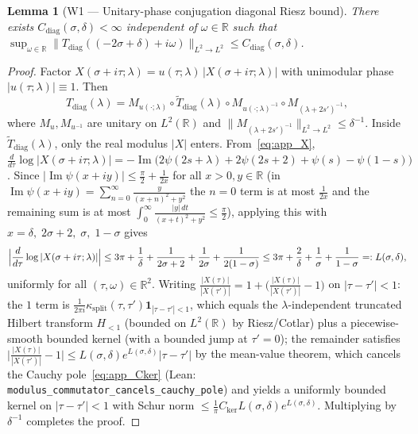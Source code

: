 \documentclass[11pt,a4paper]{article}
\newtheorem{lem}{Lemma}[section]
\begin{document}
\begin{lem}[W1 --- Unitary-phase conjugation diagonal Riesz bound]\label{lem:app_diag_riesz}
There exists $C_{\mathrm{diag}}(\sigma,\delta)<\infty$ independent of $\omega\in\mathbb{R}$ such that
$\sup_{\omega\in\mathbb{R}}\|T_{\mathrm{diag}}((-2\sigma+\delta)+i\omega)\|_{L^2\to L^2}\le C_{\mathrm{diag}}(\sigma,\delta)$.
\end{lem}
\begin{proof}
Factor $X(\sigma+i\tau;\lambda)=u(\tau;\lambda)\,|X(\sigma+i\tau;\lambda)|$ with unimodular phase $|u(\tau;\lambda)|\equiv 1$.
Then
\[
T_{\mathrm{diag}}(\lambda) = M_{u(\cdot;\lambda)}\circ \widetilde{T}_{\mathrm{diag}}(\lambda)\circ M_{u(\cdot;\lambda)^{-1}}\circ M_{(\lambda+2s')^{-1}},
\]
where $M_u, M_{u^{-1}}$ are unitary on $L^2(\mathbb{R})$ and $\|M_{(\lambda+2s')^{-1}}\|_{L^2\to L^2}\le \delta^{-1}$.
Inside $\widetilde{T}_{\mathrm{diag}}(\lambda)$, only the real modulus $|X|$ enters.  From~\eqref{eq:app_X},
$\frac{d}{d\tau}\log|X(\sigma+i\tau;\lambda)| = -\operatorname{Im}\bigl(2\psi(2s+\lambda)+2\psi(2s+2)+\psi(s)-\psi(1-s)\bigr)$.
Since $|\operatorname{Im}\psi(x+iy)|\le \frac{\pi}{2}+\frac{1}{2x}$ for all $x>0, y\in\mathbb{R}$
(in $\operatorname{Im}\psi(x+iy)=\sum_{n=0}^\infty\frac{y}{(x+n)^2+y^2}$ the $n=0$ term is at most $\frac{1}{2x}$ and the
remaining sum is at most $\int_0^\infty\frac{|y|\,dt}{(x+t)^2+y^2}\le\frac{\pi}{2}$), applying this with
$x=\delta,\;2\sigma+2,\;\sigma,\;1-\sigma$ gives
\[
\Bigl|\frac{d}{d\tau}\log|X(\sigma+i\tau;\lambda)|\Bigr|
\le 3\pi + \frac{1}{\delta} + \frac{1}{2\sigma+2} + \frac{1}{2\sigma} + \frac{1}{2(1-\sigma)}
\le 3\pi + \frac{2}{\delta} + \frac{1}{\sigma} + \frac{1}{1-\sigma} =: L(\sigma,\delta),
\]
uniformly for all $(\tau,\omega)\in\mathbb{R}^2$.
Writing $\frac{|X(\tau)|}{|X(\tau')|} = 1 + \bigl(\frac{|X(\tau)|}{|X(\tau')|}-1\bigr)$ on $|\tau-\tau'|<1$:
the $1$ term is $\frac{1}{2\pi i}\kappa_{\mathrm{split}}(\tau,\tau')\mathbf{1}_{|\tau-\tau'|<1}$,
which equals the $\lambda$-independent truncated Hilbert transform $H_{<1}$ (bounded on $L^2(\mathbb{R})$
by Riesz/Cotlar) plus a piecewise-smooth bounded kernel (with a bounded jump at $\tau'=0$); the remainder satisfies
$\bigl|\frac{|X(\tau)|}{|X(\tau')|}-1\bigr|\le L(\sigma,\delta)e^{L(\sigma,\delta)}|\tau-\tau'|$
by the mean-value theorem, which cancels the Cauchy pole~\eqref{eq:app_Cker}
(Lean: \texttt{modulus\_commutator\_cancels\_cauchy\_pole}) and yields a uniformly bounded kernel
on $|\tau-\tau'|<1$ with Schur norm $\le \frac{1}{\pi}C_{\mathrm{ker}}L(\sigma,\delta)e^{L(\sigma,\delta)}$.
Multiplying by $\delta^{-1}$ completes the proof.
\end{proof}
\end{document}
